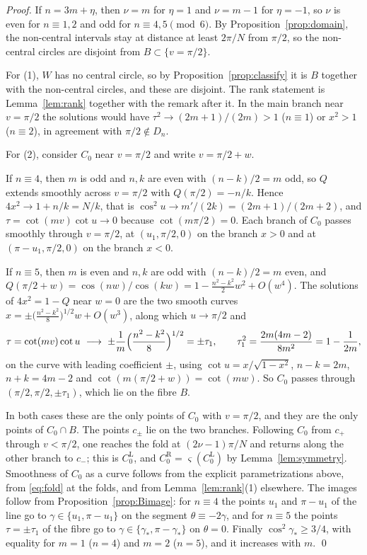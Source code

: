 \begin{proof}
If $n=3m+\eta$, then $\nu=m$ for $\eta=1$ and $\nu=m-1$ for $\eta=-1$, so $\nu$ is even for $n\equiv1,2$ and odd for
$n\equiv4,5\pmod6$. By Proposition~\ref{prop:domain}, the non-central intervals stay at distance at least $2\pi/N$
from $\pi/2$, so the non-central circles are disjoint from $B\subset\{v=\pi/2\}$.

For (1), $W$ has no central circle, so by Proposition~\ref{prop:classify} it is $B$ together with the non-central circles,
and these are disjoint. The rank statement is Lemma~\ref{lem:rank} together with the remark after it. In the main
branch near $v=\pi/2$ the solutions would have $\tau^2\to(2m+1)/(2m)>1$ ($n\equiv1$) or $x^2>1$ ($n\equiv2$), in
agreement with $\pi/2\notin D_n$.

For (2), consider $C_0$ near $v=\pi/2$ and write $v=\pi/2+w$.

If $n\equiv4$, then $m$ is odd and $n,k$ are even with $(n-k)/2=m$ odd, so $Q$ extends smoothly across
$v=\pi/2$ with $Q(\pi/2)=-n/k$. Hence $4x^2\to1+n/k=N/k$, that is $\cos^2u\to m'/(2k)=(2m+1)/(2m+2)$, and
$\tau=\cot(mv)\cot u\to0$ because $\cot(m\pi/2)=0$. Each branch of $C_0$ passes smoothly through $v=\pi/2$, at
$(u_1,\pi/2,0)$ on the branch $x>0$ and at $(\pi-u_1,\pi/2,0)$ on the branch $x<0$.

If $n\equiv5$, then $m$ is even and $n,k$ are odd with $(n-k)/2=m$ even, and
$Q(\pi/2+w)=\cos(nw)/\cos(kw)=1-\frac{n^2-k^2}2w^2+O(w^4)$. The solutions of $4x^2=1-Q$ near $w=0$ are the two smooth
curves $x=\pm\bigl(\frac{n^2-k^2}{8}\bigr)^{1/2}w+O(w^3)$, along which $u\to\pi/2$ and
\[
\tau=\cot(mv)\cot u\ \longrightarrow\ \pm\frac1m\Bigl(\frac{n^2-k^2}8\Bigr)^{1/2}=\pm\tau_1,\qquad
\tau_1^2=\frac{2m(4m-2)}{8m^2}=1-\frac1{2m},
\]
on the curve with leading coefficient $\pm$, using $\cot u=x/\sqrt{1-x^2}$, $n-k=2m$, $n+k=4m-2$ and
$\cot(m(\pi/2+w))=\cot(mw)$. So $C_0$ passes through $(\pi/2,\pi/2,\pm\tau_1)$, which lie on the fibre $B$.

In both cases these are the only points of $C_0$ with $v=\pi/2$, and they are the only points of $C_0\cap B$. The
points $c_\pm$ lie on the two branches. Following $C_0$ from $c_+$ through $v<\pi/2$, one reaches the fold at
$(2\nu-1)\pi/N$ and returns along the other branch to $c_-$; this is $C_0^{\mathrm L}$, and $C_0^{\mathrm R}=\varsigma(C_0^{\mathrm L})$ by
Lemma~\ref{lem:symmetry}. Smoothness of $C_0$ as a curve follows from the explicit parametrizations above, from
\eqref{eq:fold} at the folds, and from Lemma~\ref{lem:rank}(1) elsewhere. The images follow from
Proposition~\ref{prop:Bimage}: for $n\equiv4$ the points $u_1$ and $\pi-u_1$ of the line go to $\gamma\in\{u_1,\pi-u_1\}$ on
the segment $\theta\equiv-2\gamma$, and for $n\equiv5$ the points $\tau=\pm\tau_1$ of the fibre go to $\gamma\in\{\gamma_*,\pi-\gamma_*\}$
on $\theta=0$. Finally $\cos^2\gamma_*\ge3/4$, with equality for $m=1$ ($n=4$) and $m=2$ ($n=5$), and it increases with $m$. \qed
\end{proof}

